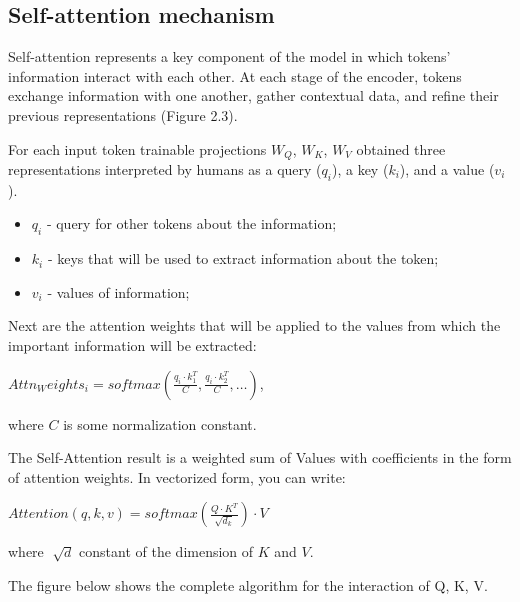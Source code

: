 \documentclass[PMI,VKR]{HSEUniversity}
\begin{document}
\subsection{Self-attention mechanism}

Self-attention represents a key component of the model in which tokens' information interact with each other.
At each stage of the encoder, tokens exchange information with one another, gather contextual data, and refine their previous representations (Figure 2.3). 

For each input token trainable projections $W_Q$, $W_K$, $W_V$ obtained three representations interpreted by humans as a query ($q_i$), a key ($k_i$), and a value ($v_i$).
\begin{itemize}
    \item $q_i$ - query for other tokens about the information;
    \item $k_i$ - keys that will be used to extract information about the token;
    \item $v_i$ - values of information;
\end{itemize}

Next are the attention weights that will be applied to the values from which the important information will be extracted:
\begin{center}
    $Attn_Weights_{i} = softmax(\frac{q_i \cdot k_{1}^T}{C}, \frac{q_i \cdot k_{2}^T}{C}, \dots)$,
\end{center}

where $C$ is some normalization constant.

The Self-Attention result is a weighted sum of Values with coefficients in the form of attention weights. In vectorized form, you can write:

\begin{center}
    $Attention(q, k, v) = softmax(\frac{Q \cdot K^T}{\sqrt{d_k}}) \cdot V $
\end{center}
where $\sqrt[]{d}$ constant of the dimension of $K$ and $V$. 

The figure below shows the complete algorithm for the interaction of Q, K, V.
\end{document}
